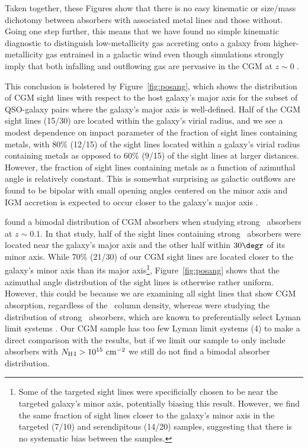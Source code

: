 \documentclass[twocolumn,twocolappendix,tighten,times]{aastex6}
\newcommand{\HI}{\ion{H}{1}}
\newcommand{\MgII}{\ion{Mg}{2}}
\begin{document}
Taken together, these Figures show that there is no easy kinematic or size/mass 
dichotomy between absorbers with associated metal lines and those without. 
Going one step further, this means that we have found no simple kinematic 
diagnostic to distinguish low-metallicity gas accreting onto a galaxy from 
higher-metallicity gas entrained in a galactic wind even though simulations 
strongly imply that both infalling and outflowing gas are pervasive in the CGM 
at $z\sim0$ \citep[e.g.,][]{keres09}. 

This conclusion is bolstered by Figure~\ref{fig:posang}, which shows the 
distribution of CGM sight lines with respect to the host galaxy's major axis for 
the subset of QSO-galaxy pairs where the galaxy's major axis is well-defined. Half 
of the CGM sight lines (15/30) are located within the galaxy's virial radius, and 
we see a modest dependence on impact parameter of the fraction of sight lines 
containing metals, with 80\% (12/15) of the sight lines located within a galaxy's 
virial radius containing metals as opposed to 60\% (9/15) of the sight lines at 
larger distances. However, the fraction of sight lines containing metals as a 
function of azimuthal angle is relatively constant. This is somewhat surprising as 
galactic outflows are found to be bipolar with small opening angles centered on the 
minor axis \citep{veilleux05} and IGM accretion is expected to occur closer to the 
galaxy's major axis \citep{keres09}. 

\citet{bouche12} found a bimodal distribution of CGM absorbers when studying
strong \MgII\ absorbers at $z\sim0.1$. In that study, half of the sight lines 
containing strong \MgII\ absorbers were located near the galaxy's major axis and 
the other half within $30\degr$ of its minor axis. While 70\% (21/30) of our 
CGM sight lines are located closer to the galaxy's minor axis than its 
major axis\footnote{Some of the targeted sight lines were specificially chosen to 
be near the targeted galaxy's minor axis, potentially biasing this result. 
However, we find the same fraction of sight lines closer to the galaxy's minor 
axis in the targeted (7/10) and serendipitous (14/20) samples, suggesting that 
there is no systematic bias between the samples.}, Figure~\ref{fig:posang} shows 
that the azimuthal angle distribution of the sight lines is otherwise rather 
uniform. However, this could be because we are examining all sight lines that show 
CGM absorption, regardless of the \HI\ column density, whereas \citet{bouche12} 
were studying the distribution of strong \MgII\ absorbers, which are known to 
preferentially select Lyman limit systems 
\citep[$N_{\rm H\,I} > 10^{17.3}~{\rm cm}^{-2}$;][]{steidel95}. Our CGM sample 
has too few Lyman limit systems (4) to make a direct comparison with the 
\citet{bouche12} results, but if we limit our sample to only include absorbers 
with $N_{\rm H\,I} > 10^{15}~{\rm cm}^{-2}$ we still do not find a bimodal 
absorber distribution.
\end{document}
